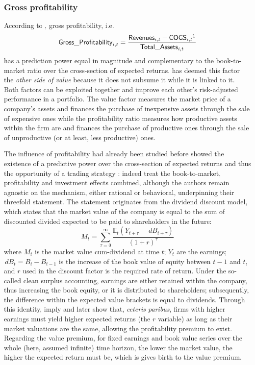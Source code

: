 \subsubsection{Gross profitability}
\label{subsubsec:profitability}
According to \textcite{Novy-Marx2013}, gross profitability, i.e.
\begin{equation}
  \mathsf{Gross\_Profitability}_{i, t} = \frac{\mathsf{Revenues}_{i, t} - \mathsf{COGS}_{i, t}\footnotemark}{\mathsf{Total\_Assets}_{i, t}}
\end{equation}
has a prediction power equal in magnitude and complementary to the book-to-market ratio over the cross-section of expected returns. \textcite{Novy-Marx2013} has deemed this factor the \emph{other side of value} because it does not subsume it while it is linked to it. Both factors can be exploited together and improve each other's risk-adjusted performance in a portfolio. The value factor measures the market price of a company's assets and finances the purchase of inexpensive assets through the sale of expensive ones while the profitability ratio measures how productive assets within the firm are and finances the purchase of productive ones through the sale of unproductive (or at least, less productive) ones.

The influence of profitability had already been studied before \textcite{Novy-Marx2013} showed the existence of a predictive power over the cross-section of expected returns and thus the opportunity of a trading strategy : indeed \textcite{Fama2006} treat the book-to-market, profitability and investment effects combined, although the authors remain agnostic on the mechanism, either rational or behavioral, underpinning their threefold statement. The statement originates from the dividend discount model, which states that the market value of the company is equal to the sum of discounted divided expected to be paid to shareholders in the future:
\begin{equation}
  M_{t} = \sum_{\tau = 0}^{\infty}\frac{\mathbb{E}_{t}(Y_{t + \tau} - \,dB_{t + \tau})}{(1 + r)^{\tau}}
\end{equation}
where $M_{t}$ is the market value cum-dividend at time $t$; $Y_{t}$ are the earnings;$\,dB_{t} = B_{t} - B_{t - 1}$ is the increase of the book value of equity between $t - 1$ and $t$, and $r$ used in the discount factor is the required rate of return. Under the so-called clean surplus accounting, earnings are either retained within the company, thus increasing the book equity, or it is distributed to shareholders; subsequently, the difference within the expected value brackets is equal to dividends. Through this identity, \textcite{Fama2006} imply and later show that, \emph{ceteris paribus}, firms with higher earnings must yield higher expected returns (the $r$ variable) as long as their market valuations are the same, allowing the profitability premium to exist. Regarding the value premium, for fixed earnings and book value series over the whole (here, assumed infinite) time horizon, the lower the market value, the higher the expected return must be, which is gives birth to the value premium.

